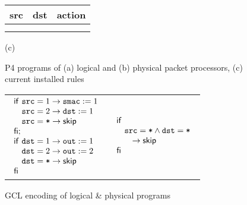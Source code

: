 \begin{figure}
\begin{ttfamily}
\begin{footnotesize}
\begin{multicols}{3}
\columnbreak

\begin{tabular}{c|c|c}
 {\ttfamily src} & {\ttfamily dst} & action \\\hline
                 &                 &        \\
                 &                 &        \\
\end{tabular}
\end{multicols}
\end{footnotesize}
\end{ttfamily}

\vspace*{-4pt}
\centering (c)


\caption{P4 programs of (a) logical and (b) physical packet processors, (c) current installed rules\label{fig:running-p4}}
\end{figure}

\begin{figure}

\begin{tabular}{c|c}
$
        \begin{array}{l}
          \IF~\var{src} = 1 \to \var{smac} := 1 \\
          \phantom{\IF}~\var{src} = 2 \to \var{dst} := 1\\
          \phantom{\IF}~\var{src} = \var{*} \to \SKIP \\
          \ENDIF ; \\
          \IF~\var{dst} = 1 \to \var{out} := 1 \\
          \phantom{\IF}~\var{dst} = 2 \to \var{out} := 2 \\
          \phantom{\IF}~\var{dst} = \var{*} \to \SKIP \\
          \ENDIF
        \end{array}
$
&
$
        \begin{array}{l}
          \IF~\\
          \phantom{\IF}~\var{src} = \var{*} \wedge \var{dst} = \var{*}\\
          \phantom{\IF}~~~\to \SKIP \\
          \ENDIF 
        \end{array}
$
\end{tabular}
\caption{GCL encoding of logical \& physical programs}
\end{figure}
